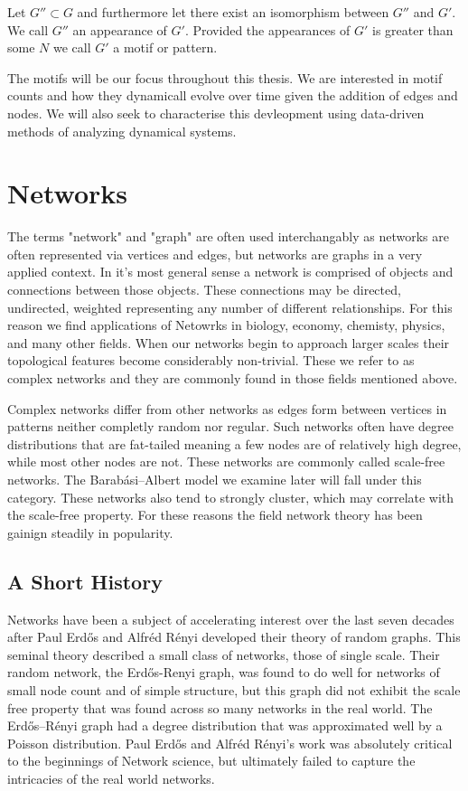 \begin{dfn}
    Let $G'' \subset G$ and furthermore let there exist an isomorphism between $G''$ and $G'$. We call
    $G''$ an appearance of $G'$. Provided the appearances of $G'$ is greater than some $N$ we call $G'$
    a motif or pattern.
\end{dfn}

The motifs will be our focus throughout this thesis. We are interested in motif counts and how they
dynamicall evolve over time given the addition of edges and nodes. We will also seek to characterise this
devleopment using data-driven methods of analyzing dynamical systems.

\chapter{Networks}
The terms "network" and "graph" are often used interchangably as networks are often represented
via vertices and edges, but networks are graphs in a very applied context. In it's 
most general sense a network is comprised of objects and connections between those objects. These
connections may be directed, undirected, weighted representing any number of different relationships. 
For this reason we find applications of Netowrks in biology, economy, chemisty, physics, and 
many other fields. When our networks begin to approach larger scales their topological features
become considerably non-trivial. These we refer to as complex networks and they are 
commonly found in those fields mentioned above. 

Complex networks differ from other networks as edges form between vertices 
in patterns neither completly random nor regular. Such networks often have degree distributions that are fat-tailed
meaning a few nodes are of relatively high degree, while most other nodes are not. These networks
are commonly called scale-free networks. The Barabási–Albert model we examine later will fall under
this category. These networks also tend to strongly cluster, which may correlate with the scale-free 
property. For these reasons the field network theory has been gainign steadily in popularity.

\section{A Short History}

\vspace{3mm}
Networks have been a subject of accelerating interest over the last seven decades after
Paul Erdős and Alfréd Rényi developed their theory of random graphs. This 
seminal theory described a small class of networks, those of single scale. Their
random network, the Erdős-Renyi graph, was found to do well for networks of small node count 
and of simple structure, but this graph did not exhibit the scale free property that was found across so many networks
in the real world. The Erdős–Rényi graph had a degree distribution that was approximated 
well by a Poisson distribution. \cite{barabasi2016network} Paul Erdős and Alfréd Rényi's work
was absolutely critical to the beginnings of Network science, but ultimately failed to 
capture the intricacies of the real world networks. 



